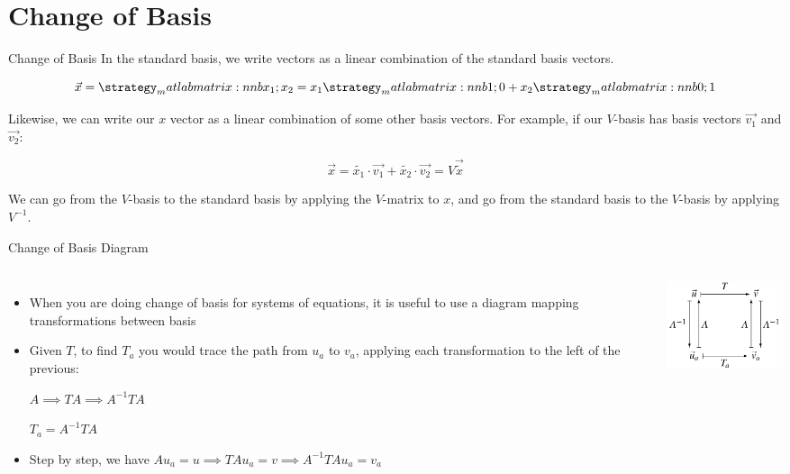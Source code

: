 \section{Change of Basis}

\begin{frame}{Change of Basis}
	    In the standard basis, we write vectors as a linear combination of the standard basis vectors.

        \[
            \vec{x} = \mat{x_1;x_2} = x_1\mat{1;0} + x_2\mat{0;1}
        \]
        
        Likewise, we can write our \(x\) vector as a linear combination of some other basis vectors. For example, if our \(V\)-basis has basis vectors $\vec{v_1}$ and $\vec{v_2}$:
        
    \[
        \vec{x} = \tilde{x_1}\cdot\vec{v_1} + \tilde{x_2}\cdot\vec{v_2} = V\vec{\tilde{x}}
    \]
        
        We can go from the \(V\)-basis to the standard basis by applying the \(V\)-matrix to \(x\), and go from the standard basis to the \(V\)-basis by applying \(V^{-1}\).
	\end{frame}
	
	\begin{frame}{Change of Basis Diagram}
    	\begin{columns}[onlytextwidth,T]
        	\column{\dimexpr\linewidth-40mm-5mm}
        	    \begin{itemize}
        	        \item When you are doing change of basis for systems of equations, it is useful to use a diagram mapping transformations between basis
                    
                    \item Given $T$, to find $T_a$ you would trace the path from $u_a$ to $v_a$, applying each transformation to the left of the previous:
                    
                    $A \implies TA \implies A^{-1}TA$
                    
                    $T_a = A^{-1}TA$
                    
                    \item Step by step, we have $Au_a = u \implies TAu_a = v \implies A^{-1}TAu_a = v_a$
        	    \end{itemize}
    	    
    	    \column{40mm}
    	        \includegraphics[width=40mm]{./images/change-of-basis-diagram.jpeg}
	    \end{columns}
	\end{frame}
	
